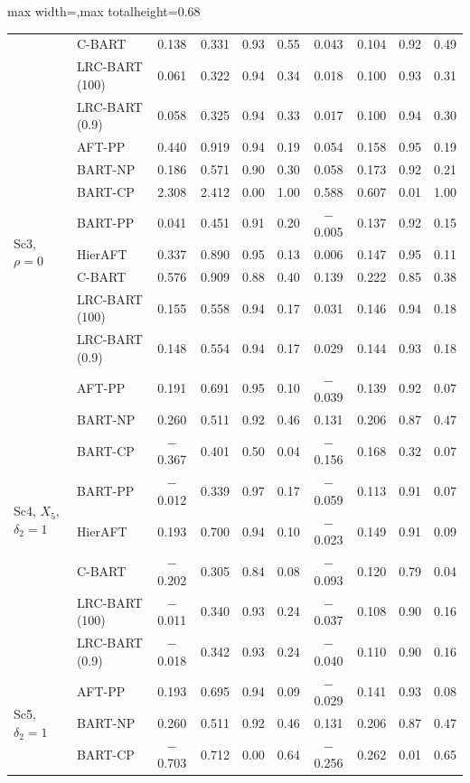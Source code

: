 \begin{table}[htbp]
\begin{adjustbox}{max width=\textwidth,max totalheight=0.68\textheight}
\begin{tabular}{llcccccccc}
& C-BART & 0.138 & 0.331 & 0.93 & 0.55 & 0.043 & 0.104 & 0.92 & 0.49 \\
& LRC-BART (100) & 0.061 & 0.322 & 0.94 & 0.34 & 0.018 & 0.100 & 0.93 & 0.31 \\
& LRC-BART (0.9) & 0.058 & 0.325 & 0.94 & 0.33 & 0.017 & 0.100 & 0.94 & 0.30 \\
\midrule
\multirow{8}{*}{Sc3, $\rho=0$} & AFT-PP & 0.440 & 0.919 & 0.94 & 0.19 & 0.054 & 0.158 & 0.95 & 0.19 \\
& BART-NP & 0.186 & 0.571 & 0.90 & 0.30 & 0.058 & 0.173 & 0.92 & 0.21 \\
& BART-CP & 2.308 & 2.412 & 0.00 & 1.00 & 0.588 & 0.607 & 0.01 & 1.00 \\
& BART-PP & 0.041 & 0.451 & 0.91 & 0.20 & $-$0.005 & 0.137 & 0.92 & 0.15 \\
& HierAFT & 0.337 & 0.890 & 0.95 & 0.13 & 0.006 & 0.147 & 0.95 & 0.11 \\
& C-BART & 0.576 & 0.909 & 0.88 & 0.40 & 0.139 & 0.222 & 0.85 & 0.38 \\
& LRC-BART (100) & 0.155 & 0.558 & 0.94 & 0.17 & 0.031 & 0.146 & 0.94 & 0.18 \\
& LRC-BART (0.9) & 0.148 & 0.554 & 0.94 & 0.17 & 0.029 & 0.144 & 0.93 & 0.18 \\
\midrule
\multirow{8}{*}{Sc4, $X_5$, $\delta_2=1$} & AFT-PP & 0.191 & 0.691 & 0.95 & 0.10 & $-$0.039 & 0.139 & 0.92 & 0.07 \\
& BART-NP & 0.260 & 0.511 & 0.92 & 0.46 & 0.131 & 0.206 & 0.87 & 0.47 \\
& BART-CP & $-$0.367 & 0.401 & 0.50 & 0.04 & $-$0.156 & 0.168 & 0.32 & 0.07 \\
& BART-PP & $-$0.012 & 0.339 & 0.97 & 0.17 & $-$0.059 & 0.113 & 0.91 & 0.07 \\
& HierAFT & 0.193 & 0.700 & 0.94 & 0.10 & $-$0.023 & 0.149 & 0.91 & 0.09 \\
& C-BART & $-$0.202 & 0.305 & 0.84 & 0.08 & $-$0.093 & 0.120 & 0.79 & 0.04 \\
& LRC-BART (100) & $-$0.011 & 0.340 & 0.93 & 0.24 & $-$0.037 & 0.108 & 0.90 & 0.16 \\
& LRC-BART (0.9) & $-$0.018 & 0.342 & 0.93 & 0.24 & $-$0.040 & 0.110 & 0.90 & 0.16 \\
\midrule
\multirow{8}{*}{Sc5, $\delta_2=1$} & AFT-PP & 0.193 & 0.695 & 0.94 & 0.09 & $-$0.029 & 0.141 & 0.93 & 0.08 \\
& BART-NP & 0.260 & 0.511 & 0.92 & 0.46 & 0.131 & 0.206 & 0.87 & 0.47 \\
& BART-CP & $-$0.703 & 0.712 & 0.00 & 0.64 & $-$0.256 & 0.262 & 0.01 & 0.65 \\

\end{tabular}
\end{adjustbox}
\end{table}
